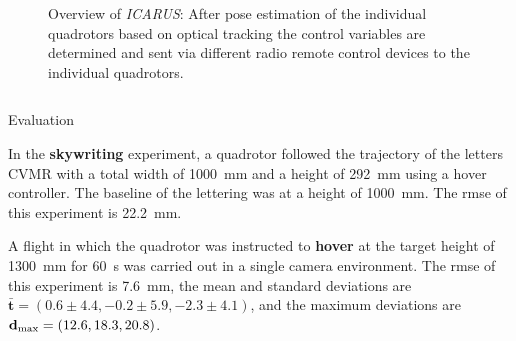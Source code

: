 \documentclass[final,hyperref={pdfpagelabels=false}]{beamer}
\newcommand{\blocktextwidth}{0.93\textwidth}
\newcommand{\icarus}{\textit{ICARUS}}
\begin{document}
\begin{frame}[t]
\begin{columns}[t]

\begin{column}{0.6375\textwidth} %

\begin{figure}
\centering

\caption*{%
Overview of \icarus{}: After pose estimation of the individual quadrotors based on optical tracking the control variables are determined and sent via different radio remote control devices to the individual quadrotors.
}
\end{figure}

\vspace{-0.55em}

\begin{columns}[T]


\begin{column}{0.486\textwidth}


\begin{block}{Evaluation}
\begin{minipage}[]{\blocktextwidth}
In the \textbf{skywriting} experiment, a quadrotor followed the trajectory of the letters CVMR with a total width of \SI{1000}{\milli\meter} and a height of \SI{292}{\milli\meter} using a hover controller.
The baseline of the lettering was at a height of \SI{1000}{\milli\meter}.
The \gls{rmse} of this experiment is \SI{22.2}{\milli\meter}.
\end{minipage}

\vspace{0.8em}

\begin{figure}
\centering\tiny
{}
\end{figure}

\vspace{1em}

\begin{minipage}[]{\blocktextwidth}
A flight in which the quadrotor was instructed to \textbf{hover} at the target height of \SI{1300}{\milli\meter} for \SI{60}{\second} was carried out in a single camera environment.
The \gls{rmse} of this experiment is \SI{7.6}{\milli\meter}, the mean and standard deviations are $\bar{\mathbf{t}} = (0.6\pm4.4, -0.2\pm5.9, -2.3\pm4.1)$, and the maximum deviations are $\mathbf{d}_{\textnormal{max}} = (12.6, 18.3, 20.8)$.
\end{minipage}


\end{block}
\end{column}
\end{columns}
\end{column}
\end{columns}
\end{frame}
\end{document}
